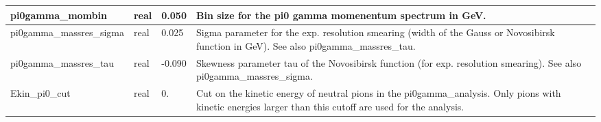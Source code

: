\documentclass{article}
\begin{document}
\begin{longtable}{llll}
\midrule
pi0gamma\_mombin & \begin{minipage}[t]{2cm}real\end{minipage} & \begin{minipage}[t]{2cm}0.050\end{minipage} & \begin{minipage}[t]{12cm}Bin size for the pi0 gamma momenentum spectrum in GeV.\end{minipage}\\*
\midrule
pi0gamma\_massres\_sigma & \begin{minipage}[t]{2cm}real\end{minipage} & \begin{minipage}[t]{2cm}0.025\end{minipage} & \begin{minipage}[t]{12cm}Sigma parameter for the exp. resolution smearing (width of the Gauss or Novosibirsk function in GeV). See also pi0gamma\_massres\_tau.\end{minipage}\\*
\midrule
pi0gamma\_massres\_tau & \begin{minipage}[t]{2cm}real\end{minipage} & \begin{minipage}[t]{2cm}-0.090\end{minipage} & \begin{minipage}[t]{12cm}Skewness parameter tau of the Novosibirsk function (for exp. resolution smearing). See also pi0gamma\_massres\_sigma.\end{minipage}\\*
\midrule
Ekin\_pi0\_cut & \begin{minipage}[t]{2cm}real\end{minipage} & \begin{minipage}[t]{2cm}0.\end{minipage} & \begin{minipage}[t]{12cm}Cut on the kinetic energy of neutral pions in the pi0gamma\_analysis. Only pions with kinetic energies larger than this cutoff are used for the analysis.\end{minipage}\\*
\bottomrule
\end{longtable}
{ }



\end{document}
